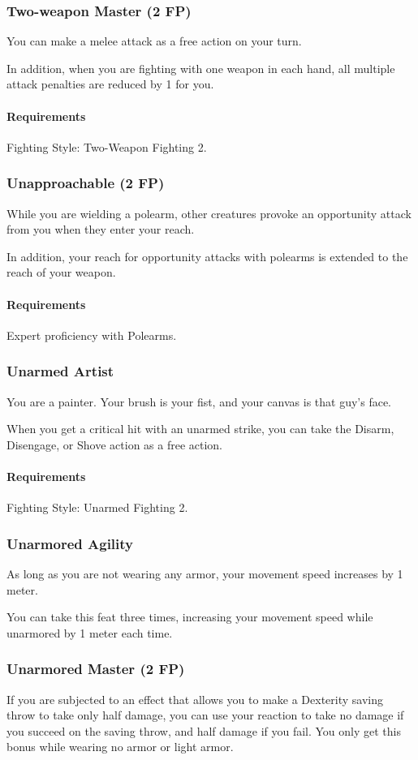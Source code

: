 \subsubsection{Two-weapon Master (2 FP)} \label{feat::twoweaponmaster}
    You can make a melee attack as a free action on your turn.

    In addition, when you are fighting with one weapon in each hand, all multiple attack penalties are reduced by 1 for you.
    \paragraph{Requirements} Fighting Style: Two-Weapon Fighting 2.
\subsubsection{Unapproachable (2 FP)} \label{feat::unapproachable}
    While you are wielding a polearm, other creatures provoke an opportunity attack from you when they enter your reach.

    In addition, your reach for opportunity attacks with polearms is extended to the reach of your weapon.
    \paragraph{Requirements} Expert proficiency with Polearms.
\subsubsection{Unarmed Artist} \label{feat::unarmedartist}
    You are a painter.
    Your brush is your fist, and your canvas is that guy's face.

    When you get a critical hit with an unarmed strike, you can take the Disarm, Disengage, or Shove action as a free action.
    \paragraph{Requirements} Fighting Style: Unarmed Fighting 2.
\subsubsection{Unarmored Agility} \label{feat::unarmoredagility}
    As long as you are not wearing any armor, your movement speed increases by 1 meter.

    You can take this feat three times, increasing your movement speed while unarmored by 1 meter each time.
\subsubsection{Unarmored Master (2 FP)} \label{feat::unarmoredmaster}
    If you are subjected to an effect that allows you to make a Dexterity saving throw to take only half damage, you can use your reaction to take no damage if you succeed on the saving throw, and half damage if you fail.
    You only get this bonus while wearing no armor or light armor.

